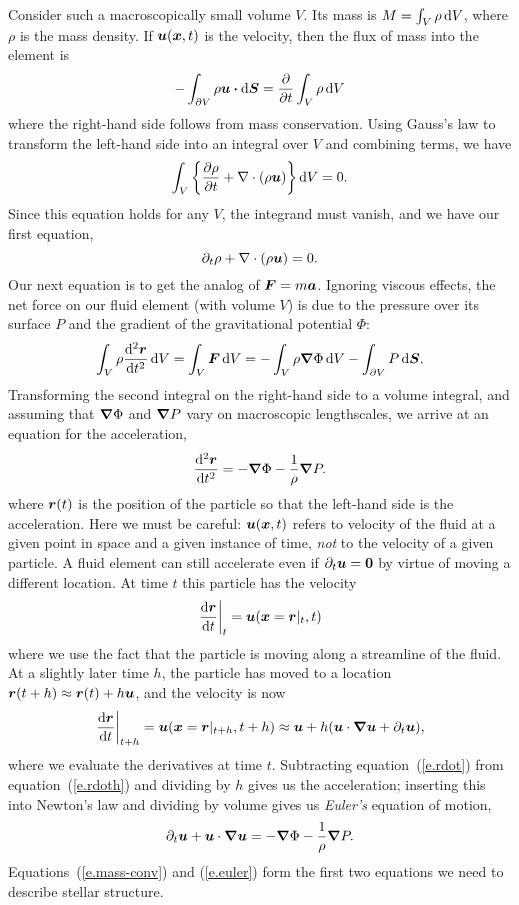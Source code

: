Consider such a macroscopically small volume $V$. Its mass is $M = \int_{V} \rho\,\mathrm{d} V$, where $\rho$ is the mass density.  If $\boldsymbol{u}(\boldsymbol{x},t)$ is the velocity, then the flux of mass into the element is
\[
-\int_{\partial V}\rho\boldsymbol{u}\boldsymbol{\cdot} \mathrm{d} \boldsymbol{S} = \frac{\partial}{\partial t}\int_{V}\rho\,\mathrm{d} V
\]
where the right-hand side follows from mass conservation.  Using Gauss's law to transform the left-hand side into an integral over $V$ and combining terms, we have
\[
\int_{V} \left\{ \frac{\partial\rho}{\partial t} + \nabla \cdot(\rho\boldsymbol{u})\right\}\mathrm{d} V = 0.
\]
Since this equation holds for any $V$, the integrand must vanish, and we have our first equation,
\begin{equation}\label{e.mass-conv}
\partial_{t}\rho + \nabla \cdot(\rho\boldsymbol{u}) = 0.
\end{equation}
Our next equation is to get the analog of $\boldsymbol{F} = m\boldsymbol{a}$.  Ignoring viscous effects, the net force on our fluid element (with volume $V$) is due to the pressure over its surface $P$ and the gradient of the gravitational potential $\Phi$:
\[
\int_{V}\rho \frac{\mathrm{d}^{2}\boldsymbol{r}}{\mathrm{d} t^{2}}\,\mathrm{d} V = \int_{V}\boldsymbol{F}\,\mathrm{d} V =  -\int_{V}\rho\boldsymbol{\nabla}\Phi\,\mathrm{d} V - \int_{\partial V}P \,\mathrm{d} \boldsymbol{S}.
\]
Transforming the second integral on the right-hand side to a volume integral, and assuming that $\boldsymbol{\nabla} \Phi$ and $\boldsymbol{\nabla} P$ vary on macroscopic lengthscales, we arrive at an equation for the acceleration,
\begin{equation}\label{e.accel}
\frac{\mathrm{d}^{2}\boldsymbol{r}}{\mathrm{d} t^{2}} = -\boldsymbol{\nabla}\Phi - \frac{1}{\rho}\boldsymbol{\nabla} P.
\end{equation}
where $\boldsymbol{r}(t)$ is the position of the particle so that the left-hand side is the acceleration.
Here we must be careful: $\boldsymbol{u}(\boldsymbol{x},t)$ refers to velocity of the fluid at a given point in space and a given instance of time, \emph{not} to the velocity of a given particle.  A fluid element can still accelerate even if $\partial_{t}\boldsymbol{u} = \boldsymbol{0}$ by virtue of moving a different location. At time $t$ this particle has the velocity
\begin{equation}\label{e.rdot}
\left.\frac{\mathrm{d}\boldsymbol{r}}{\mathrm{d} t}\right|_{t} = \boldsymbol{u}(\boldsymbol{x} = \boldsymbol{r}|_{t},t)
\end{equation}
where we use the fact that the particle is moving along a streamline of the fluid. At a slightly later time $h$, the particle has moved to a location $\boldsymbol{r}(t + h) \approx \boldsymbol{r}(t) + h\boldsymbol{u}$, and the velocity is now
\begin{equation}\label{e.rdoth}
\left.\frac{\mathrm{d}\boldsymbol{r}}{\mathrm{d} t}\right|_{t+h} = \boldsymbol{u}(\boldsymbol{x} = \boldsymbol{r}|_{t+h},t+h)\approx \boldsymbol{u} + h(\boldsymbol{u}\cdot\boldsymbol{\nabla}\boldsymbol{u} + \partial_{t}\boldsymbol{u}),
\end{equation}
where we evaluate the derivatives at time $t$. Subtracting equation~(\ref{e.rdot}) from equation~(\ref{e.rdoth}) and dividing by $h$ gives us the acceleration; inserting this into Newton's law and dividing by volume gives us \emph{Euler's} equation of motion,
\begin{equation}\label{e.euler}
\partial_{t}\boldsymbol{u} + \boldsymbol{u}\cdot\boldsymbol{\nabla}\boldsymbol{u} = -\boldsymbol{\nabla} \Phi - \frac{1}{\rho}\boldsymbol{\nabla} P.
\end{equation}
Equations~(\ref{e.mass-conv}) and (\ref{e.euler}) form the first two equations we need to describe stellar structure.

